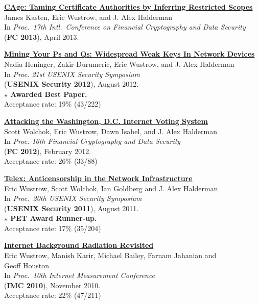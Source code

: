 \documentclass[margin,11pt]{res} %
\begin{document}
    \textbf{\href{https://jhalderm.com/pub/papers/cage-fc13.pdf}{CAge: Taming Certificate Authorities by Inferring Restricted Scopes}} \\
    James Kasten, Eric Wustrow, and J. Alex Halderman \\
    In \emph{Proc.\ 17th Intl.\ Conference on Financial Cryptography and Data Security} \\
    (\textbf{FC 2013}), April 2013.

    \textbf{\href{https://factorable.net/weakkeys12.conference.pdf}{Mining Your Ps and Qs: Widespread Weak Keys In Network Devices}} \\
    Nadia Heninger, Zakir Durumeric, Eric Wustrow, and J. Alex Halderman \\
    In \emph{Proc. 21st USENIX Security Symposium} \\
    (\textbf{USENIX Security 2012}), August 2012. \\
    \textbf{$\star$ Awarded Best Paper.} \\
    Acceptance rate: 19\% (43/222)

    \textbf{\href{https://ericw.us/trow/dc-internet-voting-fc.pdf}{Attacking the Washington, D.C. Internet Voting System}} \\
    Scott Wolchok, Eric Wustrow, Dawn Isabel, and J. Alex Halderman \\
    In \emph{Proc. 16th Financial Cryptography and Data Security} \\
    (\textbf{FC 2012}), February 2012. \\
    Acceptance rate: 26\% (33/88)

    \textbf{\href{https://telex.cc/pub/telex-usenixsec11.pdf}{Telex: Anticensorship in the Network Infrastructure}} \\
    Eric Wustrow, Scott Wolchok, Ian Goldberg and J. Alex Halderman \\
    In \emph{Proc.\ 20th USENIX Security Symposium} \\
    (\textbf{USENIX Security 2011}), August 2011. \\
        \textbf{$\star$ PET Award Runner-up.} \\
    Acceptance rate: 17\% (35/204)

    \textbf{\href{https://ericw.us/trow/imc10-wustrow.pdf}{Internet Background Radiation Revisited}} \\
        Eric Wustrow, Manish Karir, Michael Bailey, Farnam Jahanian and\\ Geoff Houston \\
        In \emph{Proc.\ 10th Internet Measurement Conference} \\
        (\textbf{IMC 2010}), November 2010.\\
        Acceptance rate: 22\% (47/211)
\end{document}
